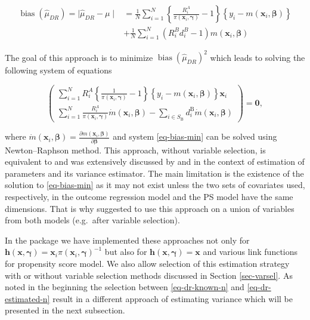 \documentclass[
]{jss}
\begin{document}
\begin{equation}
\begin{aligned}
\operatorname{bias}\left(\hat{\mu}_{D R}\right) = \mid\hat{\mu}_{DR}-\mu\mid &=\frac{1}{N} \sum_{i=1}^N\left\{\frac{R_i^A}{\pi\left(\boldsymbol{x}_i, \boldsymbol{\gamma}\right)} - 1\right\}\left\{y_i-m\left(\boldsymbol{x}_i, \boldsymbol{\beta}\right)\right\}\\
& + \frac{1}{N} \sum_{i=1}^N\left(R_i^B d_i^B-1\right) m\left(\boldsymbol{x}_i, \boldsymbol{\beta}\right)
\end{aligned}
\label{eq-dr-bias}
\end{equation}

The goal of this approach is to minimize
\(\operatorname{bias}\left(\hat{\mu}_{D R}\right)^2\) which leads to
solving the following system of equations

\begin{equation}
\left(\begin{array}{c}
\sum_{i=1}^N R_i^A\left\{\frac{1}{\pi\left(\boldsymbol{x}_i, \boldsymbol{\gamma}\right)}-1\right\}\left\{y_i-m\left(\boldsymbol{x}_i, \boldsymbol{\beta}\right)\right\} \boldsymbol{x}_i \\
\sum_{i=1}^N \frac{R_i^A}{\pi\left(\boldsymbol{x}_i, \boldsymbol{\gamma}\right)} \dot{m}\left(\boldsymbol{x}_i, \boldsymbol{\beta}\right) -\sum_{i \in S_{\mathrm{B}}} d_i^{\mathrm{B}} \dot{m}\left(\boldsymbol{x}_i, \boldsymbol{\beta}\right)
\end{array}\right) = \boldsymbol{0},
\label{eq-bias-min}
\end{equation}

where
\(\dot{m}\left(\boldsymbol{x}_i, \boldsymbol{\beta}\right)=\frac{\partial m\left(\boldsymbol{x}_i, \boldsymbol{\beta}\right)}{\partial \boldsymbol{\beta}}\)
and system \eqref{eq-bias-min} can be solved using Newton--Raphson
method. This approach, without variable selection, is equivalent to
\citet{kim2014doubly} and was extensively discussed by
\citet{chen2020doubly} and \citet{wu2022statistical} in the context of
estimation of parameters and its variance estimator. The main limitation
is the existence of the solution to \eqref{eq-bias-min} as it may not
exist unless the two sets of covariates used, respectively, in the
outcome regression model and the PS model have the same dimensions. That
is why \citet{yang_doubly_2020} suggested to use this approach on a
union of variables from both models (e.g.~after variable selection).

In the  package we have implemented these approaches not
only for
\(\boldsymbol{h}(\boldsymbol{x}, \boldsymbol{\gamma})=\boldsymbol{x}_i \pi\left(\boldsymbol{x}_i, \boldsymbol{\gamma}\right)^{-1}\)
but also for
\(\boldsymbol{h}(\boldsymbol{x}, \boldsymbol{\gamma})=\boldsymbol{x}\)
and various link functions for propensity score model. We also allow
selection of this estimation strategy with or without variable selection
methods discussed in Section \ref{sec-varsel}. As noted in the beginning
the selection between \eqref{eq-dr-known-n} and
\eqref{eq-dr-estimated-n} result in a different approach of estimating
variance which will be presented in the next subsection.
\end{document}
